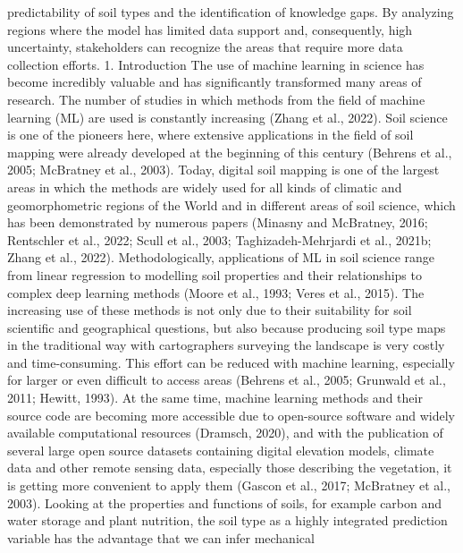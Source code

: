 predictability of soil types and the identification of knowledge gaps. By analyzing regions where the model has
limited data support and, consequently, high uncertainty, stakeholders can recognize the areas that require more
data collection efforts.
1. Introduction
The use of machine learning in science has become incredibly
valuable and has significantly transformed many areas of research. The
number of studies in which methods from the field of machine learning
(ML) are used is constantly increasing (Zhang et al., 2022). Soil science
is one of the pioneers here, where extensive applications in the field of
soil mapping were already developed at the beginning of this century
(Behrens et al., 2005; McBratney et al., 2003). Today, digital soil mapping
is one of the largest areas in which the methods are widely used for
all kinds of climatic and geomorphometric regions of the World and in
different areas of soil science, which has been demonstrated by
numerous papers (Minasny and McBratney, 2016; Rentschler et al.,
2022; Scull et al., 2003; Taghizadeh-Mehrjardi et al., 2021b; Zhang
et al., 2022). Methodologically, applications of ML in soil science range
from linear regression to modelling soil properties and their relationships
to complex deep learning methods (Moore et al., 1993; Veres et al.,
2015). The increasing use of these methods is not only due to their
suitability for soil scientific and geographical questions, but also because
producing soil type maps in the traditional way with cartographers
surveying the landscape is very costly and time-consuming. This effort
can be reduced with machine learning, especially for larger or even
difficult to access areas (Behrens et al., 2005; Grunwald et al., 2011;
Hewitt, 1993). At the same time, machine learning methods and their
source code are becoming more accessible due to open-source software
and widely available computational resources (Dramsch, 2020), and
with the publication of several large open source datasets containing
digital elevation models, climate data and other remote sensing data,
especially those describing the vegetation, it is getting more convenient
to apply them (Gascon et al., 2017; McBratney et al., 2003).
Looking at the properties and functions of soils, for example carbon
and water storage and plant nutrition, the soil type as a highly integrated
prediction variable has the advantage that we can infer mechanical

